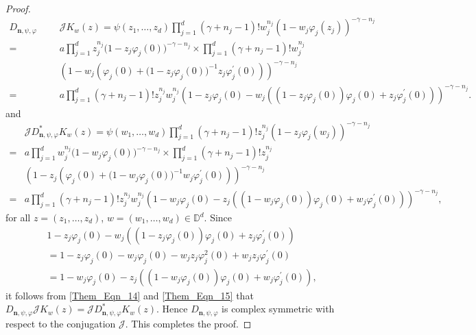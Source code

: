 \documentclass[12pt, reqno]{amsart}
\theoremstyle{definition}
\theoremstyle{remark}
\numberwithin{equation}{section}
\newcommand{\mfn}{\mathbf n}
\begin{document}
\begin{proof}
  	   \begin{align}\label{Them_Eqn_14}
  	   D_{\mfn,\psi, \varphi}&\mathcal{J}K_w(z)
  	 = \psi(z_1, \dots, z_d)\prod_{j=1}^d(\gamma+n_j-1)!w_j^{n_j}(1-w_j\varphi_j(z_j))^{-\gamma-n_j}\nonumber\\
  	  =&a\prod_{j=1}^dz_j^{n_j}\big(1-z_j\varphi_j(0)\big)^{-\gamma-n_j}\times\prod_{j=1}^d(\gamma+n_j-1)!w_j^{n_j}\nonumber\\
  	 ~~~~~~~~~~~~~~~~~~~~&\left(1-w_j\left(\varphi_j(0)+\big(1-z_j\varphi_j(0)\big)^{-1}z_j\varphi_j^{\prime}(0)\right)\right)^{-\gamma-n_j}\nonumber\\
  	  =&a\prod_{j=1}^d(\gamma+n_j-1)!z_j^{n_j}w_j^{n_j}\left(1-z_j\varphi_j(0)-w_j\left((1-z_j\varphi_j(0))\varphi_j(0)+z_j\varphi_j^{\prime}(0)\right) \right)^{-\gamma-n_j}.
  	  \end{align} 
  	  and 
  	   \begin{align}\label{Them_Eqn_15}
  	  &  \mathcal{J}D_{\mfn,\psi, \varphi}^*K_w(z)
  	  = \psi(w_1, \dots, w_d)\prod_{j=1}^d(\gamma+n_j-1)!z_j^{n_j}(1-z_j\varphi_j(w_j))^{-\gamma-n_j}\nonumber\\
  	  =&a\prod_{j=1}^dw_j^{n_j}\big(1-w_j\varphi_j(0)\big)^{-\gamma-n_j}\times\prod_{j=1}^d(\gamma+n_j-1)!z_j^{n_j}\nonumber\\
  	  &\left(1-z_j\left(\varphi_j(0)+\big(1-w_j\varphi_j(0)\big)^{-1}w_j\varphi_j^{\prime}(0)\right)\right)^{-\gamma-n_j}\nonumber\\
  	  =&a\prod_{j=1}^d(\gamma+n_j-1)!z_j^{n_j}w_j^{n_j}\left(1-w_j\varphi_j(0)-z_j\left((1-w_j\varphi_j(0))\varphi_j(0)+w_j\varphi_j^{\prime}(0)\right) \right)^{-\gamma-n_j},
  	  \end{align} 
  	   for all $z=(z_1, \dots, z_d)$, $w=(w_1, \dots, w_d)\in \mathbb{D}^d$.
  	   Since 
  	   \begin{align}\label{Them_Eqn_16}
  	   &1-z_j\varphi_j(0)-w_j\left((1-z_j\varphi_j(0))\varphi_j(0)+z_j\varphi_j^{\prime}(0)\right)\nonumber\\
  	   &=1-z_j\varphi_j(0)-w_j\varphi_j(0)-w_jz_j\varphi_j^2(0)+w_jz_j\varphi_j^{\prime}(0)\nonumber\\
  	   &=1-w_j\varphi_j(0)-z_j\left((1-w_j\varphi_j(0))\varphi_j(0)+w_j\varphi_j^{\prime}(0)\right),
  	   \end{align}
  	   it follows from \eqref{Them_Eqn_14} and \eqref{Them_Eqn_15} that 
  	   $D_{\mfn,\psi, \varphi}\mathcal{J}K_w(z)=\mathcal{J}D_{\mfn,\psi, \varphi}^*K_w(z)$. Hence $D_{\mfn,\psi,\varphi}$ is complex symmetric with respect to the conjugation $\mathcal{J}$. This completes the proof.
\end{proof}
\end{document}
